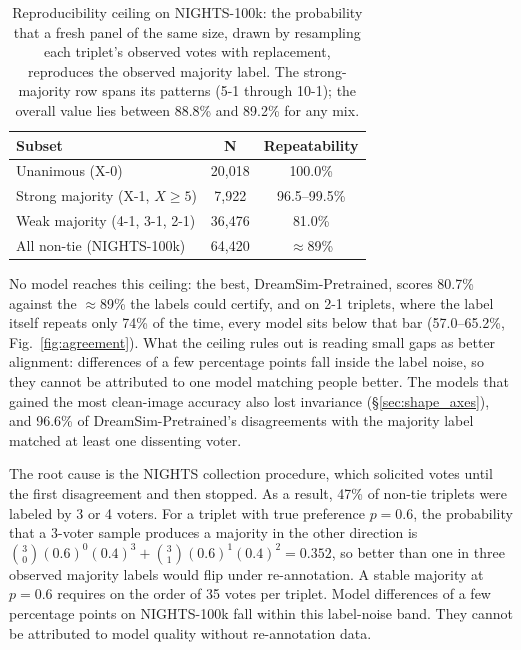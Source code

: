 \documentclass{article}
\begin{document}
\begin{table}[ht]
\caption{Reproducibility ceiling on NIGHTS-100k: the probability that a fresh panel of the same size, drawn by resampling each triplet's observed votes with replacement, reproduces the observed majority label. The strong-majority row spans its patterns (5-1 through 10-1); the overall value lies between 88.8\% and 89.2\% for any mix.}
\label{tab:ceiling}
\centering
\begin{tabular}{lcc}
\toprule
Subset & N & Repeatability \\
\midrule
Unanimous (X-0) & 20{,}018 & 100.0\% \\
Strong majority (X-1, $X \geq 5$) & 7{,}922 & 96.5--99.5\% \\
Weak majority (4-1, 3-1, 2-1) & 36{,}476 & 81.0\% \\
\midrule
All non-tie (NIGHTS-100k) & 64{,}420 & $\approx$89\% \\
\bottomrule
\end{tabular}
\end{table}

No model reaches this ceiling: the best, DreamSim-Pretrained, scores 80.7\% against the $\approx$89\% the labels could certify, and on 2-1 triplets, where the label itself repeats only 74\% of the time, every model sits below that bar (57.0--65.2\%, Fig.~\ref{fig:agreement}). What the ceiling rules out is reading small gaps as better alignment: differences of a few percentage points fall inside the label noise, so they cannot be attributed to one model matching people better. The models that gained the most clean-image accuracy also lost invariance (\S\ref{sec:shape_axes}), and 96.6\% of DreamSim-Pretrained's disagreements with the majority label matched at least one dissenting voter.

The root cause is the NIGHTS collection procedure, which solicited votes until the first disagreement and then stopped. As a result, 47\% of non-tie triplets were labeled by 3 or 4 voters. For a triplet with true preference $p = 0.6$, the probability that a 3-voter sample produces a majority in the other direction is $\binom{3}{0}(0.6)^0(0.4)^3 + \binom{3}{1}(0.6)^1(0.4)^2 = 0.352$, so better than one in three observed majority labels would flip under re-annotation. A stable majority at $p=0.6$ requires on the order of 35 votes per triplet. Model differences of a few percentage points on NIGHTS-100k fall within this label-noise band. They cannot be attributed to model quality without re-annotation data.
\end{document}
